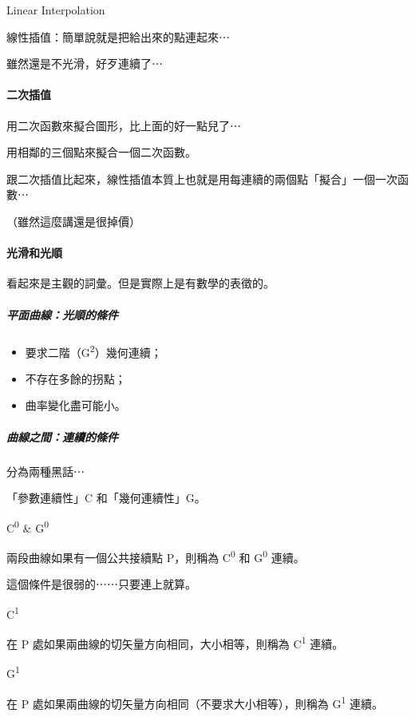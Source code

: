 \documentclass[
]{article}
\begin{document}
Linear Interpolation

線性插值：簡單說就是把給出來的點連起來⋯

雖然還是不光滑，好歹連續了⋯

\hypertarget{header-n174}{%
\paragraph{二次插值}\label{header-n174}}

用二次函數來擬合圖形，比上面的好一點兒了⋯

用相鄰的三個點來擬合一個二次函數。

跟二次插值比起來，線性插值本質上也就是用每連續的兩個點「擬合」一個一次函數⋯

（雖然這麼講還是很掉價）

\hypertarget{header-n179}{%
\paragraph{光滑和光順}\label{header-n179}}

看起來是主觀的詞彙。但是實際上是有數學的表徵的。

\hypertarget{header-n181}{%
\subparagraph{平面曲線：光順的條件}\label{header-n181}}

\begin{itemize}
\item
  要求二階（G\textsuperscript{2}）幾何連續；
\item
  不存在多餘的拐點；
\item
  曲率變化盡可能小。
\end{itemize}

\hypertarget{header-n189}{%
\subparagraph{曲線之間：連續的條件}\label{header-n189}}

分為兩種黑話⋯

「參數連續性」C 和「幾何連續性」G。

C\textsuperscript{0} \& G\textsuperscript{0}

兩段曲線如果有一個公共接續點 P，則稱為 C\textsuperscript{0} 和
G\textsuperscript{0} 連續。

這個條件是很弱的⋯⋯只要連上就算。

C\textsuperscript{1}

在 P 處如果兩曲線的切矢量方向相同，大小相等，則稱為 C\textsuperscript{1}
連續。

G\textsuperscript{1}

在 P 處如果兩曲線的切矢量方向相同（不要求大小相等），則稱為
G\textsuperscript{1} 連續。
\end{document}

